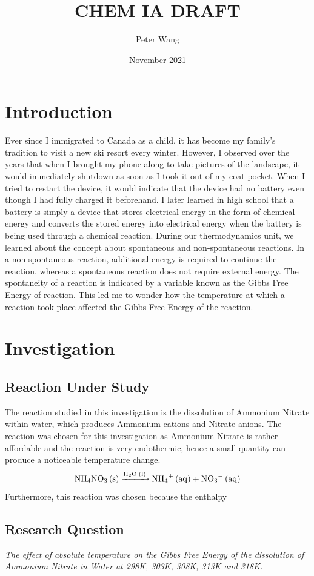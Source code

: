 \documentclass{article}
\title{CHEM IA DRAFT}
\author{Peter Wang}
\date{November 2021}
\begin{document}
\maketitle
\section{Introduction}
Ever since I immigrated to Canada as a child, it has become my family’s tradition to visit a new ski resort every winter. However, I observed over the years that when I brought my phone along to take pictures of the landscape, it would immediately shutdown as soon as I took it out of my coat pocket. When I tried to restart the device, it would indicate that the device had no battery even though I had fully charged it beforehand. I later learned in high school that a battery is simply a device that stores electrical energy in the form of chemical energy and converts the stored energy into electrical energy when the battery is being used through a chemical reaction. During our thermodynamics unit, we learned about the concept about spontaneous and non-spontaneous reactions. In a non-spontaneous reaction, additional energy is required to continue the reaction, whereas a spontaneous reaction does not require external energy. The spontaneity of a reaction is indicated by a variable known as the Gibbs Free Energy of reaction. This led me to wonder how the temperature at which a reaction took place affected the Gibbs Free Energy of the reaction.

\section{Investigation}
\subsection{Reaction Under Study}
The reaction studied in this investigation is the dissolution of Ammonium Nitrate within water, which produces Ammonium cations and Nitrate anions. The reaction was chosen for this investigation as Ammonium Nitrate is rather affordable and the reaction is very endothermic, hence a small quantity can produce a noticeable temperature change. 
\begin{equation}
\ce{NH4NO3 (s) ->[H2O (l)] NH4+ (aq) + NO3- (aq)}
\end{equation}
Furthermore, this reaction was chosen because the enthalpy

\subsection{Research Question}
\textit{The effect of absolute temperature on the Gibbs Free Energy of the dissolution of Ammonium Nitrate in Water at 298K, 303K, 308K, 313K and 318K.}
\end{document}
